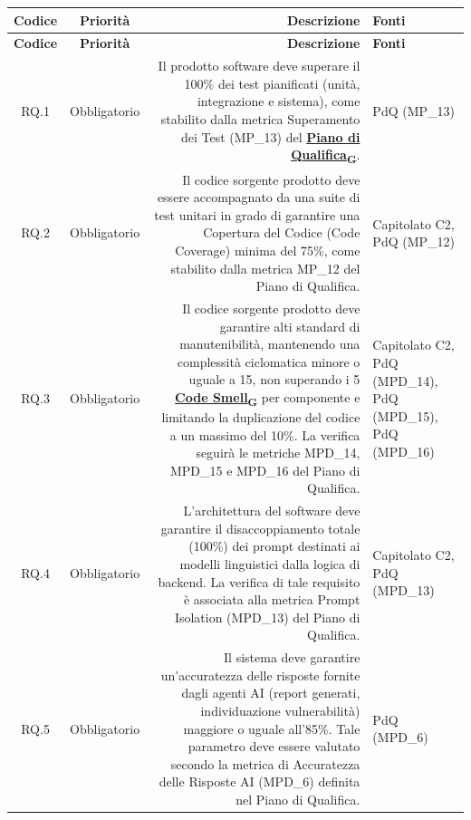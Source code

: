 \documentclass[12pt, a4paper]{article}
\newcommand{\urlglossario}{https://skynetunigroup.github.io/Code_Guardian/Documentazione/PB/glossario_v2.0.0.pdf} %
\newcommand{\glo}[2]{\href{\urlglossario\#nameddest=#2}{#1\textsubscript{G}}}
\begin{document}
\begin{xltabular}{\textwidth}{|c|c|D|F|}

    \hline
    \textbf{Codice} & \textbf{Priorità} & \textbf{Descrizione} & \textbf{Fonti} \\ 
    \hline
    \endfirsthead

    \hline
    \textbf{Codice} & \textbf{Priorità} & \textbf{Descrizione} & \textbf{Fonti} \\ 
    \hline
    \endhead

\hline
RQ.1 & Obbligatorio & Il prodotto software deve superare il 100\% dei test pianificati (unità, integrazione e sistema), come stabilito dalla metrica Superamento dei Test (MP\_13) del \textbf{\glo{Piano di Qualifica}{piano-di-qualifica}}. & PdQ (MP\_13) \\ 
\hline
RQ.2 & Obbligatorio & Il codice sorgente prodotto deve essere accompagnato da una suite di test unitari in grado di garantire una Copertura del Codice (Code Coverage) minima del 75\%, come stabilito dalla metrica MP\_12 del Piano di Qualifica. & Capitolato C2, PdQ (MP\_12) \\ 
\hline
RQ.3 & Obbligatorio & Il codice sorgente prodotto deve garantire alti standard di manutenibilità, mantenendo una complessità ciclomatica minore o uguale a 15, non superando i 5 \textbf{\glo{Code Smell}{code-smell}} per componente e limitando la duplicazione del codice a un massimo del 10\%. La verifica seguirà le metriche MPD\_14, MPD\_15 e MPD\_16 del Piano di Qualifica. & Capitolato C2, PdQ (MPD\_14), PdQ (MPD\_15), PdQ (MPD\_16) \\ 
\hline
RQ.4 & Obbligatorio & L'architettura del software deve garantire il disaccoppiamento totale (100\%) dei prompt destinati ai modelli linguistici dalla logica di backend. La verifica di tale requisito è associata alla metrica Prompt Isolation (MPD\_13) del Piano di Qualifica. & Capitolato C2, PdQ (MPD\_13) \\ 
\hline
RQ.5 & Obbligatorio & Il sistema deve garantire un'accuratezza delle risposte fornite dagli agenti AI (report generati, individuazione vulnerabilità) maggiore o uguale all'85\%. Tale parametro deve essere valutato secondo la metrica di Accuratezza delle Risposte AI (MPD\_6) definita nel Piano di Qualifica. & PdQ (MPD\_6) \\ 
\hline


\end{xltabular}
\end{document}
